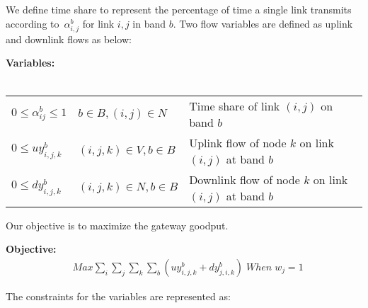 
We define time share to represent the percentage of time a 
single link transmits according to~$\alpha_{i,j}^b$
for link $i,j$ in band $b$. Two flow 
variables are defined as uplink and downlink flows as below:

\noindent
{\bf Variables:}\\
\\
\begin{tabular}{llp{3cm}}
$0\le \alpha_{ij}^b \le 1$  & $b\in B, (i,j) \in N$ & 
Time share of link $(i,j)$ on band $b$\\ 
$0\le uy_{i,j,k}^b$ & $(i,j,k) \in V, b \in B$ & 
Uplink flow of node $k$ on link $(i,j)$ at band $b$ \\ 
$0\le dy_{i,j,k}^b$ & $(i,j,k) \in N, b \in B$ & 
Downlink flow of node $k$ on link $(i,j)$ at band $b$ \\ 
\end{tabular}

Our objective is to maximize the gateway goodput.

\noindent
{\bf Objective:}
\begin{align}
& Max \sum_i\sum_j\sum_k\sum_b(uy_{i,j,k}^b+dy_{j,i,k}^b) \; When \; w_j=1
\end{align}

The constraints for the variables are represented as:  

